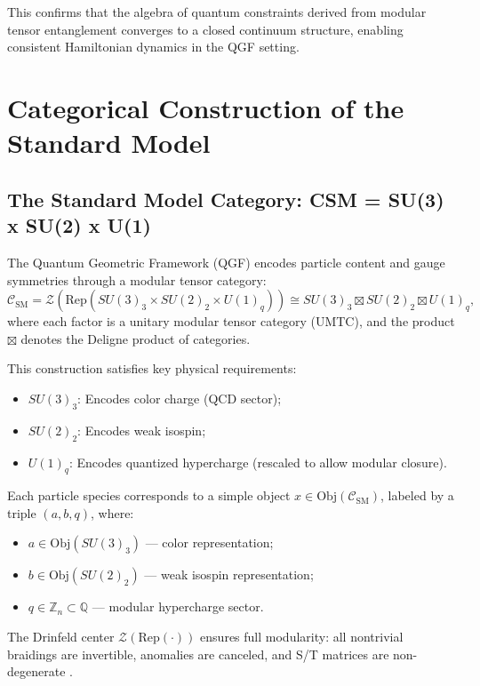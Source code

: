 \documentclass[11pt]{article}
\def\texorpdfstring#1#2{#2}
\begin{document}
\vspace{0.8em}
\noindent This confirms that the algebra of quantum constraints derived from modular tensor entanglement converges to a closed continuum structure, enabling consistent Hamiltonian dynamics in the QGF setting.


\section{Categorical Construction of the Standard Model}

\subsection[
  The Standard Model Category
]{The Standard Model Category: \texorpdfstring{\( \mathcal{C}_{\text{SM}} = SU(3)_3 \boxtimes SU(2)_2 \boxtimes U(1)_q \)}{CSM = SU(3) x SU(2) x U(1)}}


The Quantum Geometric Framework (QGF) encodes particle content and gauge symmetries through a modular tensor category:
\[
\mathcal{C}_{\text{SM}} = \mathcal{Z}(\text{Rep}(SU(3)_3 \times SU(2)_2 \times U(1)_q)) \cong SU(3)_3 \boxtimes SU(2)_2 \boxtimes U(1)_q,
\]
where each factor is a unitary modular tensor category (UMTC), and the product \( \boxtimes \) denotes the Deligne product of categories.

\noindent This construction satisfies key physical requirements:
\begin{itemize}
  \item \( SU(3)_3 \): Encodes color charge (QCD sector);
  \item \( SU(2)_2 \): Encodes weak isospin;
  \item \( U(1)_q \): Encodes quantized hypercharge (rescaled to allow modular closure).
\end{itemize}

Each particle species corresponds to a simple object \( x \in \text{Obj}(\mathcal{C}_{\text{SM}}) \), labeled by a triple \( (a, b, q) \), where:
\begin{itemize}
  \item \( a \in \text{Obj}(SU(3)_3) \) — color representation;
  \item \( b \in \text{Obj}(SU(2)_2) \) — weak isospin representation;
  \item \( q \in \mathbb{Z}_n \subset \mathbb{Q} \) — modular hypercharge sector.
\end{itemize}

\noindent The Drinfeld center \( \mathcal{Z}(\text{Rep}(\cdot)) \) ensures full modularity: all nontrivial braidings are invertible, anomalies are canceled, and S/T matrices are non-degenerate \cite{Ostrik2002, Muger2003}. 
\end{document}
